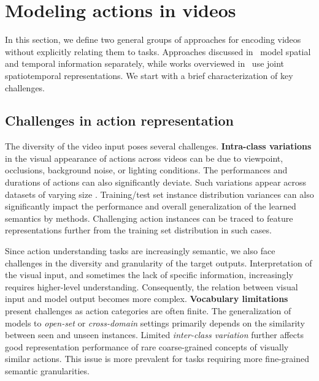 \section{Modeling actions in videos}
\label{sec:modeling}

In this section, we define two general groups of approaches for encoding videos without explicitly relating them to tasks. Approaches discussed in~ model spatial and temporal information separately, while works overviewed in~ use joint spatiotemporal representations. We start with a brief characterization of key challenges.

\subsection{Challenges in action representation}
\label{sec:modeling::challenges}
The diversity of the video input poses several challenges. \textbf{Intra-class variations} in the visual appearance of actions across videos can be due to viewpoint, occlusions, background noise, or lighting conditions. The performances and durations of actions can also significantly deviate. Such variations appear across datasets of varying size \citep{grauman2022ego4d,kay2017kinetics,miech2019howto100m,soomro2012ucf101}. Training/test set instance distribution variances can also significantly impact the performance and overall generalization of the learned semantics by methods. Challenging action instances can be traced to feature representations further from the training set distribution in such cases.

Since action understanding tasks are increasingly semantic, we also face challenges in the diversity and granularity of the target outputs. Interpretation of the visual input, and sometimes the lack of specific information, increasingly requires higher-level understanding. Consequently, the relation between visual input and model output becomes more complex. \textbf{Vocabulary limitations} present challenges as action categories are often finite. The generalization of models to \emph{open-set} or \emph{cross-domain} settings primarily depends on the similarity between seen and unseen instances. Limited \textit{inter-class variation} further affects good representation performance of rare coarse-grained concepts of visually similar actions. This issue is more prevalent for tasks requiring more fine-grained semantic granularities.


